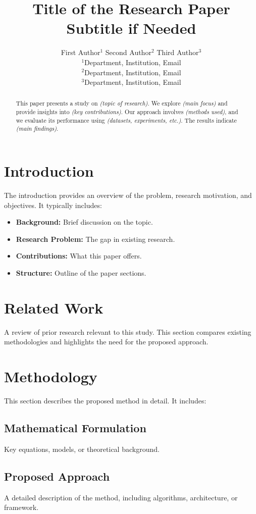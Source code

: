 \documentclass[a4paper,12pt]{article}
\title{\LARGE \textbf{Title of the Research Paper} \\[1ex] \large Subtitle if Needed}
\author{
    First Author$^{1}$ \quad Second Author$^{2}$ \quad Third Author$^{3}$ \\[1ex]
    \small $^{1}$Department, Institution, Email \\
    \small $^{2}$Department, Institution, Email \\
    \small $^{3}$Department, Institution, Email
}
\date{}
\begin{document}
\maketitle

\begin{abstract}
    \noindent This paper presents a study on \textit{(topic of research)}. We explore \textit{(main focus)} and provide insights into \textit{(key contributions)}. Our approach involves \textit{(methods used)}, and we evaluate its performance using \textit{(datasets, experiments, etc.)}. The results indicate \textit{(main findings)}.
\end{abstract}

\section{Introduction}
\noindent The introduction provides an overview of the problem, research motivation, and objectives. It typically includes:

\begin{itemize}
    \item \textbf{Background:} Brief discussion on the topic.
    \item \textbf{Research Problem:} The gap in existing research.
    \item \textbf{Contributions:} What this paper offers.
    \item \textbf{Structure:} Outline of the paper sections.
\end{itemize}

\section{Related Work}
\noindent A review of prior research relevant to this study. This section compares existing methodologies and highlights the need for the proposed approach.

\section{Methodology}
\noindent This section describes the proposed method in detail. It includes:

\subsection{Mathematical Formulation}
Key equations, models, or theoretical background.

\subsection{Proposed Approach}
A detailed description of the method, including algorithms, architecture, or framework.
\end{document}
